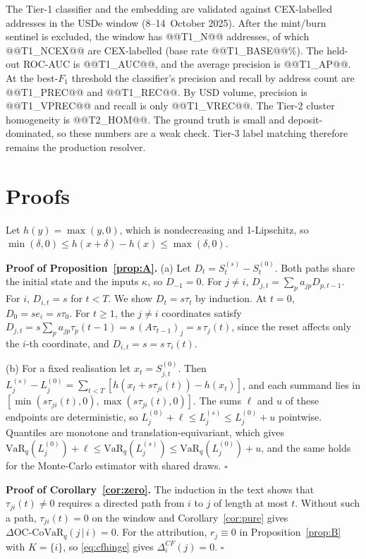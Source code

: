\documentclass[referee,pdflatex,sn-mathphys-ay]{sn-jnl}
\theoremstyle{thmstyleone}%
\theoremstyle{thmstyletwo}%
\theoremstyle{thmstylethree}%
\newcommand{\VaR}{\mathrm{VaR}}
\newcommand{\OCCoVaR}{\text{OC-CoVaR}}
\begin{document}
\begin{appendices}
The Tier-1 classifier and the embedding are validated against CEX-labelled addresses in the USDe window
(8--14~October 2025). After the mint/burn sentinel is excluded, the window has @@T1_N@@ addresses, of which @@T1_NCEX@@ are CEX-labelled
(base rate @@T1_BASE@@\%). The held-out ROC-AUC is @@T1_AUC@@, and the average precision is @@T1_AP@@. At the best-$F_1$
threshold the classifier's precision and recall by address count are @@T1_PREC@@ and @@T1_REC@@. By USD volume, precision is
@@T1_VPREC@@ and recall is only @@T1_VREC@@. The Tier-2 cluster homogeneity is @@T2_HOM@@.
The ground truth is small and deposit-dominated, so these numbers are a weak check. Tier-3 label matching therefore remains the
production resolver.

\section{Proofs}\label{app:proofs}

Let $h(y)=\max(y,0)$, which is nondecreasing and 1-Lipschitz, so $\min(\delta,0)\le h(x+\delta)-h(x)\le\max(\delta,0)$.

\noindent\textbf{Proof of Proposition~\ref{prop:A}.} (a) Let $D_t=S^{(s)}_t-S^{(0)}_t$.
Both paths share the initial state and the inputs $\kappa$, so $D_{-1}=0$. For $j\neq i$,
$D_{j,t}=\sum_p a_{jp}D_{p,t-1}$. For $i$, $D_{i,t}=s$ for $t<T$. We show $D_t=s\tau_t$ by
induction. At $t=0$, $D_0=se_i=s\tau_0$. For $t\ge1$, the $j\neq i$ coordinates satisfy
$D_{j,t}=s\sum_pa_{jp}\tau_{p}(t-1)=s\,(A\tau_{t-1})_j=s\,\tau_j(t)$, since the reset
affects only the $i$-th coordinate, and $D_{i,t}=s=s\,\tau_i(t)$.

(b) For a fixed realisation let $x_t=S^{(0)}_{j,t}$. Then $L_j^{(s)}-L_j^{(0)}=\sum_{t<T}[h(x_t+s\tau_{ji}(t))-h(x_t)]$, and each summand lies in $[\min(s\tau_{ji}(t),0),\max(s\tau_{ji}(t),0)]$. The sums $\ell$ and $u$ of these endpoints are deterministic, so $L_j^{(0)}+\ell\le L_j^{(s)}\le L_j^{(0)}+u$ pointwise. Quantiles are monotone and translation-equivariant, which gives $\VaR_q(L^{(0)}_j)+\ell\le\VaR_q(L^{(s)}_j)\le\VaR_q(L^{(0)}_j)+u$, and the same holds for the Monte-Carlo estimator with shared draws. \hfill$\square$

\noindent\textbf{Proof of Corollary~\ref{cor:zero}.} The induction in the text shows that $\tau_{ji}(t)\neq0$ requires a directed path from $i$ to $j$ of length at most $t$. Without such a path, $\tau_{ji}(t)=0$ on the window and Corollary~\ref{cor:pure} gives $\Delta\OCCoVaR_q(j\,|\,i)=0$. For the attribution, $r_j\equiv0$ in Proposition~\ref{prop:B} with $K=\{i\}$, so \eqref{eq:cfhinge} gives $\Delta_i^{CF}(j)=0$. \hfill$\square$


\end{appendices}
\end{document}

